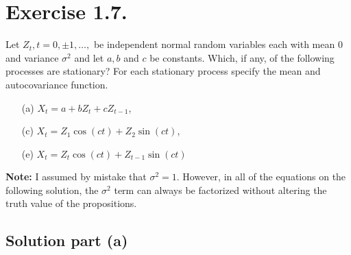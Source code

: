 \section*{Exercise 1.7.}

Let $Z_t, t= 0,\pm 1, \ldots,$ be independent normal random variables each with mean 0 and variance $\sigma^2$ and let $a,b$ and $c$ be constants. Which, if any, of the following processes are stationary? For each stationary process specify the mean and autocovariance function.
\begin{enumerate}
    \item[(a)] $X_t = a + bZ_t + cZ_{t-1}$,
    \item[(c)] $X_t = Z_1 \cos(ct) + Z_2 \sin(ct)$,
    \item[(e)] $X_t = Z_t \cos(ct) + Z_{t-1}\sin(ct)$ 
\end{enumerate}

\textbf{Note:} I assumed by mistake that $\sigma^2 = 1$. However, in all of the equations on the following solution, the $\sigma^2$ term can always be factorized without altering the truth value of the propositions.

\subsection*{Solution part (a)}

